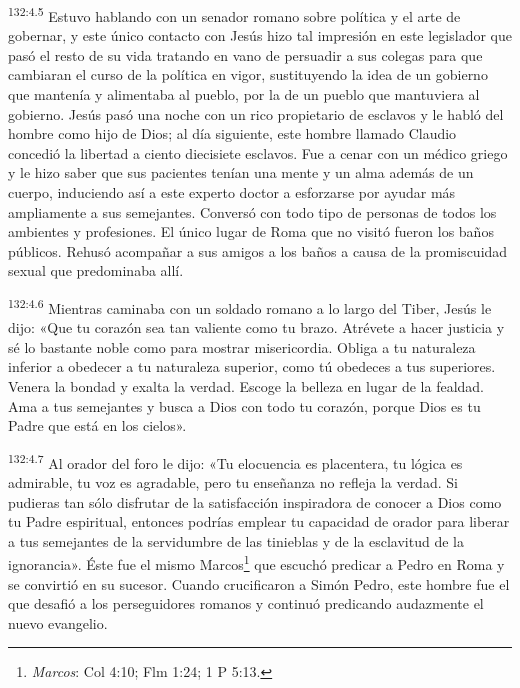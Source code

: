 \par
\textsuperscript{132:4.5} Estuvo hablando con un senador romano sobre política y el arte de gobernar, y este único contacto con Jesús hizo tal impresión en este legislador que pasó el resto de su vida tratando en vano de persuadir a sus colegas para que cambiaran el curso de la política en vigor, sustituyendo la idea de un gobierno que mantenía y alimentaba al pueblo, por la de un pueblo que mantuviera al gobierno. Jesús pasó una noche con un rico propietario de esclavos y le habló del hombre como hijo de Dios; al día siguiente, este hombre llamado Claudio concedió la libertad a ciento diecisiete esclavos. Fue a cenar con un médico griego y le hizo saber que sus pacientes tenían una mente y un alma además de un cuerpo, induciendo así a este experto doctor a esforzarse por ayudar más ampliamente a sus semejantes. Conversó con todo tipo de personas de todos los ambientes y profesiones. El único lugar de Roma que no visitó fueron los baños públicos. Rehusó acompañar a sus amigos a los baños a causa de la promiscuidad sexual que predominaba allí.

\par
\textsuperscript{132:4.6} Mientras caminaba con un soldado romano a lo largo del Tiber, Jesús le dijo: «Que tu corazón sea tan valiente como tu brazo. Atrévete a hacer justicia y sé lo bastante noble como para mostrar misericordia. Obliga a tu naturaleza inferior a obedecer a tu naturaleza superior, como tú obedeces a tus superiores. Venera la bondad y exalta la verdad. Escoge la belleza en lugar de la fealdad. Ama a tus semejantes y busca a Dios con todo tu corazón, porque Dios es tu Padre que está en los cielos».

\par
\textsuperscript{132:4.7} Al orador del foro le dijo: «Tu elocuencia es placentera, tu lógica es admirable, tu voz es agradable, pero tu enseñanza no refleja la verdad. Si pudieras tan sólo disfrutar de la satisfacción inspiradora de conocer a Dios como tu Padre espiritual, entonces podrías emplear tu capacidad de orador para liberar a tus semejantes de la servidumbre de las tinieblas y de la esclavitud de la ignorancia». Éste fue el mismo Marcos\footnote{\textit{Marcos}: Col 4:10; Flm 1:24; 1 P 5:13.} que escuchó predicar a Pedro en Roma y se convirtió en su sucesor. Cuando crucificaron a Simón Pedro, este hombre fue el que desafió a los perseguidores romanos y continuó predicando audazmente el nuevo evangelio.


